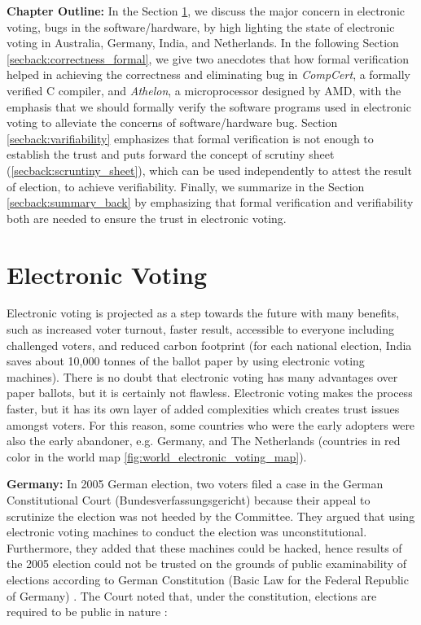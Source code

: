  
\textbf{Chapter Outline:}
 In the Section \ref{secback:electronic_voting}, we discuss 
 the major concern in electronic voting, bugs in the software/hardware, 
 by high lighting the 
 state of electronic voting in Australia, Germany, India, 
 and Netherlands. In the following Section \ref{secback:correctness_formal}, we  give 
 two anecdotes that how formal verification helped in achieving 
 the correctness and eliminating bug in \textit{CompCert}, a formally verified C compiler, 
 and \textit{Athelon}, a microprocessor designed by AMD, with 
 the emphasis that we should formally verify the software programs
 used in electronic voting to alleviate the concerns of 
 software/hardware bug. Section \ref{secback:varifiability} 
 emphasizes that formal verification is not enough
 to establish the trust and puts forward the concept of 
 scrutiny sheet (\ref{secback:scruntiny_sheet}), which 
 can be used independently to attest the result of election, 
 to achieve verifiability. Finally, we summarize in the Section \ref{secback:summary_back}
 by emphasizing that formal verification and verifiability both are needed 
 to ensure the trust in electronic voting. 
 
  

\section{Electronic Voting}
 \label{secback:electronic_voting}
  Electronic voting is projected as a step towards the future with 
  many benefits, such as increased voter turnout, faster result, 
  accessible to everyone including challenged voters, and reduced 
  carbon footprint (for each 
  national election, India saves about 10,000 tonnes of the ballot 
  paper by using electronic voting machines). 
  There is no doubt that electronic voting has many advantages 
  over paper ballots, but it is certainly not flawless.  
  Electronic voting makes 
  the process faster, but it has its own layer of added complexities 
  which creates trust issues amongst voters. For this reason, some countries 
  who were the early adopters were also the early abandoner, e.g.
  Germany, and The Netherlands (countries in red color in the world map 
  \ref{fig:world_electronic_voting_map}).
  
  
  \textbf{Germany:} In 2005 German election, two voters filed a case in the German 
  Constitutional Court (Bundesverfassungsgericht) because their 
  appeal to scrutinize the election 
  was not heeded by the Committee. They argued that using electronic 
  voting machines to conduct the election was unconstitutional. Furthermore,
  they added that
  these machines could be hacked, hence results of the 2005 election 
  could not be trusted on the grounds 
  of public examinability of elections according to German Constitution 
  (Basic Law for the Federal Republic of Germany) \citep{Germanconst}. 
  The Court noted that, under the constitution, elections are 
  required to be public in nature \citep{Germanconst}:
  
